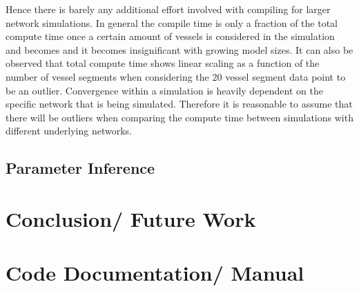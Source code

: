 \documentclass[a4paper, oneside]{discothesis}
\begin{document}
Hence there is barely any additional effort involved with compiling for larger network simulations.
In general the compile time is only a fraction of the total compute time once a certain amount of vessels is considered in the simulation and becomes and it becomes insignificant with growing model sizes.
It can also be observed that total compute time shows linear scaling as a function of the number of vessel segments when considering the 20 vessel segment data point to be an outlier.
Convergence within a simulation is heavily dependent on the specific network that is being simulated.
Therefore it is reasonable to assume that there will be outliers when comparing the compute time between simulations with different underlying networks.


\section{Parameter Inference} \label{sec:pi}

\chapter{Conclusion/ Future Work}





\appendix
\chapter{Code Documentation/ Manual} \label{app:doc}
\end{document}
